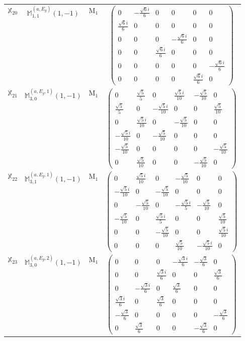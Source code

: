 \documentclass[fleqn,10pt,landscape]{article}
\begin{document}
\begin{itemize}
\begin{center}
\begin{longtable}{c|c|c|c}
$ \mathbb{X}_{20} $ & $\mathbb{M}_{1,1}^{(a,E_{g})}(1,-1)$ & M$_{1}$ & $\begin{pmatrix} 0 & - \frac{\sqrt{6} i}{6} & 0 & 0 & 0 & 0 \\ \frac{\sqrt{6} i}{6} & 0 & 0 & 0 & 0 & 0 \\ 0 & 0 & 0 & - \frac{\sqrt{6} i}{6} & 0 & 0 \\ 0 & 0 & \frac{\sqrt{6} i}{6} & 0 & 0 & 0 \\ 0 & 0 & 0 & 0 & 0 & - \frac{\sqrt{6} i}{6} \\ 0 & 0 & 0 & 0 & \frac{\sqrt{6} i}{6} & 0 \end{pmatrix}$ \\
$ \mathbb{X}_{21} $ & $\mathbb{M}_{3,0}^{(a,E_{g},1)}(1,-1)$ & M$_{1}$ & $\begin{pmatrix} 0 & \frac{\sqrt{5}}{5} & 0 & \frac{\sqrt{5} i}{10} & - \frac{\sqrt{5}}{10} & 0 \\ \frac{\sqrt{5}}{5} & 0 & - \frac{\sqrt{5} i}{10} & 0 & 0 & \frac{\sqrt{5}}{10} \\ 0 & \frac{\sqrt{5} i}{10} & 0 & - \frac{\sqrt{5}}{10} & 0 & 0 \\ - \frac{\sqrt{5} i}{10} & 0 & - \frac{\sqrt{5}}{10} & 0 & 0 & 0 \\ - \frac{\sqrt{5}}{10} & 0 & 0 & 0 & 0 & - \frac{\sqrt{5}}{10} \\ 0 & \frac{\sqrt{5}}{10} & 0 & 0 & - \frac{\sqrt{5}}{10} & 0 \end{pmatrix}$ \\
$ \mathbb{X}_{22} $ & $\mathbb{M}_{3,1}^{(a,E_{g},1)}(1,-1)$ & M$_{1}$ & $\begin{pmatrix} 0 & \frac{\sqrt{5} i}{10} & 0 & - \frac{\sqrt{5}}{10} & 0 & 0 \\ - \frac{\sqrt{5} i}{10} & 0 & - \frac{\sqrt{5}}{10} & 0 & 0 & 0 \\ 0 & - \frac{\sqrt{5}}{10} & 0 & - \frac{\sqrt{5} i}{5} & - \frac{\sqrt{5}}{10} & 0 \\ - \frac{\sqrt{5}}{10} & 0 & \frac{\sqrt{5} i}{5} & 0 & 0 & \frac{\sqrt{5}}{10} \\ 0 & 0 & - \frac{\sqrt{5}}{10} & 0 & 0 & \frac{\sqrt{5} i}{10} \\ 0 & 0 & 0 & \frac{\sqrt{5}}{10} & - \frac{\sqrt{5} i}{10} & 0 \end{pmatrix}$ \\
$ \mathbb{X}_{23} $ & $\mathbb{M}_{3,0}^{(a,E_{g},2)}(1,-1)$ & M$_{1}$ & $\begin{pmatrix} 0 & 0 & 0 & - \frac{\sqrt{3} i}{6} & - \frac{\sqrt{3}}{6} & 0 \\ 0 & 0 & \frac{\sqrt{3} i}{6} & 0 & 0 & \frac{\sqrt{3}}{6} \\ 0 & - \frac{\sqrt{3} i}{6} & 0 & \frac{\sqrt{3}}{6} & 0 & 0 \\ \frac{\sqrt{3} i}{6} & 0 & \frac{\sqrt{3}}{6} & 0 & 0 & 0 \\ - \frac{\sqrt{3}}{6} & 0 & 0 & 0 & 0 & - \frac{\sqrt{3}}{6} \\ 0 & \frac{\sqrt{3}}{6} & 0 & 0 & - \frac{\sqrt{3}}{6} & 0 \end{pmatrix}$ \\

\end{longtable}
\end{center}
\end{itemize}
\end{document}
